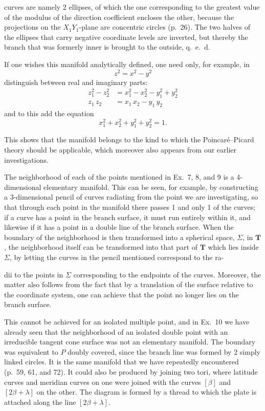\documentclass{article}
\begin{document}
curves are namely 2 ellipses, of which the one corresponding to the greatest value of the modulus of the direction coefficient encloses the other, because the projections on the $X_1 Y_1$-plane are concentric circles (p.\ 26). The two halves of the ellipses that carry negative coordinate levels are inverted, but thereby the branch that was formerly inner is brought to the outside, q.\ e.\ d.

If one wishes this manifold analytically defined, one need only, for example, in
\[
z^2 = x^2 - y^2
\]
distinguish between real and imaginary parts:
\[
\begin{aligned}
z_1^2 - z_2^2 &= x_1^2 - x_2^2 - y_1^2 + y_2^2 \\
z_1\,z_2 &= x_1\,x_2 - y_1\,y_2
\end{aligned}
\]
and to this add the equation
\[
x_1^2 + x_2^2 + y_1^2 + y_2^2 = 1.
\]

This shows that the manifold belongs to the kind to which the Poincaré--Picard theory should be applicable, which moreover also appears from our earlier investigations.

The neighborhood of each of the points mentioned in Ex.\ 7, 8, and 9 is a 4-dimensional elementary manifold. This can be seen, for example, by constructing a 3-dimensional pencil of curves radiating from the point we are investigating, so that through each point in the manifold there passes 1 and only 1 of the curves; if a curve has a point in the branch surface, it must run entirely within it, and likewise if it has a point in a double line of the branch surface. When the boundary of the neighborhood is then transformed into a spherical space, $\Sigma$, in $\mathbf{T}$, the neighborhood itself can be transformed into that part of $\mathbf{T}$ which lies inside $\Sigma$, by letting the curves in the pencil mentioned correspond to the ra-

dii to the points in $\Sigma$ corresponding to the endpoints of the curves. Moreover, the matter also follows from the fact that by a translation of the surface relative to the coordinate system, one can achieve that the point no longer lies on the branch surface.

This cannot be achieved for an isolated multiple point, and in Ex.\ 10 we have already seen that the neighborhood of an isolated double point with an irreducible tangent cone surface was not an elementary manifold. The boundary was equivalent to $P$ doubly covered, since the branch line was formed by 2 simply linked circles. It is the same manifold that we have repeatedly encountered (p.\ 59, 61, and 72). It could also be produced by joining two tori, where latitude curves and meridian curves on one were joined with the curves $[\beta]$ and $[2\beta + \lambda]$ on the other. The diagram is formed by a thread to which the plate is attached along the line $[2\beta + \lambda]$.
\end{document}

